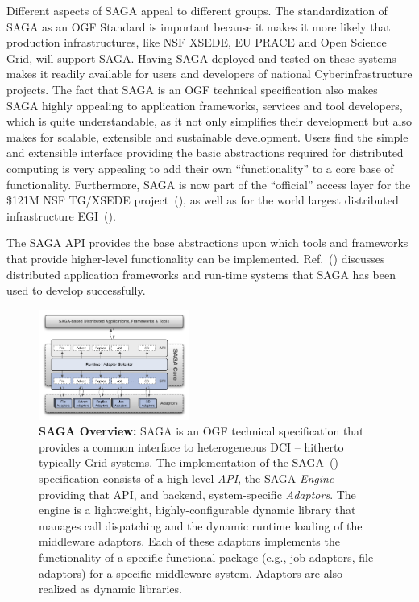 \documentclass{sig-alternate}
\begin{document}
Different aspects of SAGA appeal to different groups. The
standardization of SAGA as an OGF Standard is important because it
makes it more likely that production infrastructures, like NSF XSEDE,
EU PRACE and Open Science Grid, will support SAGA. Having SAGA
deployed and tested on these systems makes it readily available for
users and developers of national Cyberinfrastructure projects. The
fact that SAGA is an OGF technical specification also makes SAGA
highly appealing to application frameworks, services and tool
developers, which is quite understandable, as it not only simplifies
their development but also makes for scalable, extensible and
sustainable development. Users find the simple and extensible
interface providing the basic abstractions required for distributed
computing is very appealing to add their own ``functionality'' to a
core base of functionality. Furthermore, SAGA is now part of the
``official'' access layer for the \$121M NSF TG/XSEDE
project~(\cite{xsede_url}), as well as for the world largest distributed
infrastructure EGI~(\cite{egi_url}).

The SAGA API provides the base abstractions upon which tools and
frameworks that provide higher-level functionality can be
implemented. Ref.~(\cite{saga_url}) discusses distributed application
frameworks and run-time systems that SAGA has been used to develop
successfully. 

\begin{figure}[t]
\centering
\includegraphics[width=0.44\textwidth]{./figs/saga-architecture-1}
\caption{\textbf{SAGA Overview: } SAGA is an OGF technical
  specification that provides a common interface to heterogeneous DCI
  -- hitherto typically Grid systems.  The implementation of the
  SAGA~(\cite{saga_url}) specification consists of a high-level {\it
    API}, the SAGA {\it Engine} providing that API, and backend,
  system-specific {\it Adaptors}.  The engine is a lightweight,
  highly-configurable dynamic library that manages call dispatching
  and the dynamic runtime loading of the middleware adaptors.  Each of
  these adaptors implements the functionality of a specific functional
  package (e.g., job adaptors, file adaptors) for a specific
  middleware system. Adaptors are also realized as dynamic libraries.}
 \label{fig:saga-overview}
\end{figure}
\end{document}
